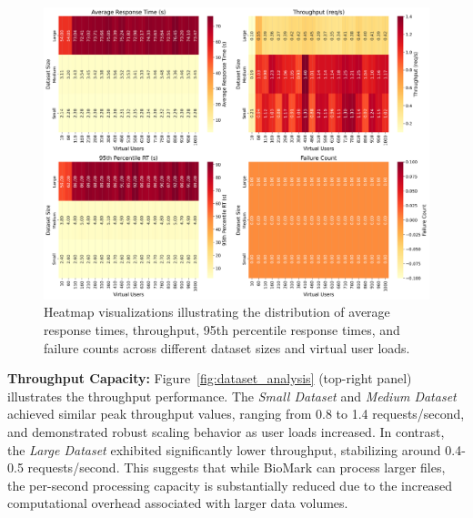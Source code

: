 \documentclass[journal]{IEEEtran}
\begin{document}
\begin{figure}[htbp]
\centering
\includegraphics[width=\columnwidth]{loadtest_results/dataset_size_heatmaps.png}
\caption{Heatmap visualizations illustrating the distribution of average response times, throughput, 95th percentile response times, and failure counts across different dataset sizes and virtual user loads.}
\label{fig:dataset_heatmaps}
\end{figure}

\textbf{Throughput Capacity:} Figure~\ref{fig:dataset_analysis} (top-right panel) illustrates the throughput performance. The \textit{Small Dataset} and \textit{Medium Dataset} achieved similar peak throughput values, ranging from 0.8 to 1.4 requests/second, and demonstrated robust scaling behavior as user loads increased. In contrast, the \textit{Large Dataset} exhibited significantly lower throughput, stabilizing around 0.4-0.5 requests/second. This suggests that while BioMark can process larger files, the per-second processing capacity is substantially reduced due to the increased computational overhead associated with larger data volumes.
\end{document}
